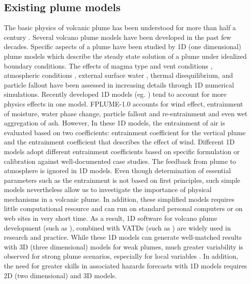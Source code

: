 \documentclass[journal abbreviation, manuscript]{copernicus}
\begin{document}
\subsection{Existing plume models}
The basic physics of volcanic plume has been understood for more than half a century \citep{morton1956turbulent, settle1978volcanic, wilson1978control}. Several volcano plume models have been developed in the past few decades. Specific aspects of a plume have been studied by 1D (one dimensional) plume models which describe the steady state solution of a plume under idealized boundary conditions.
The effects of magma type and vent conditions \citep{woods1988fluid, woods1995decompression}, atmospheric conditions \citep{ woods1993moist, sparks1997volcanic, bursik2001effect}, external surface water \citep{koyaguchi1996formation}, thermal disequilibrium, and particle fallout \citep{woods1991particle} have been assessed in increasing details through 1D numerical simulations. Recently developed 1D models (eg. \citep{mastin2007user, woodhouse2013interaction}) tend to account for more physics effects in one model. FPLUME-1.0 \citep{folch2016fplume} accounts for wind effect, entrainment of moisture, water phase change, particle fallout and re-entrainment and even wet aggregation of ash. However, In these 1D models, the entrainment of air is evaluated based on two coefficients: entrainment coefficient for the vertical plume and the entrainment coefficient that describes the effect of wind. Different 1D models adopt different entrainment coefficients based on specific formulation or calibration against well-documented case studies. The feedback from plume to atmosphere is ignored in 1D models. Even though determination of essential parameters such as the entrainment is not based on first principles, such simple models nevertheless allow us to investigate the importance of physical mechanisms in a volcanic plume. In addition, these simplified models requires little computational resource and can run on standard personal computers or on web sites in very short time. As a result, 1D software for volcano plume development (such as \citep{267, 1194, 3541}), combined with VATDs (such as \citep{114, draxler2015hysplit}) are widely used in research and practice. While these 1D models can generate well-matched results with 3D (three dimensional) models for weak plumes, much greater variability is observed for strong plume scenarios, especially for local variables \citep{costa2016results}. In addition, the need for greater skills in associated hazards forecasts with 1D models requires 2D (two dimensional) and 3D models.\\
\end{document}
